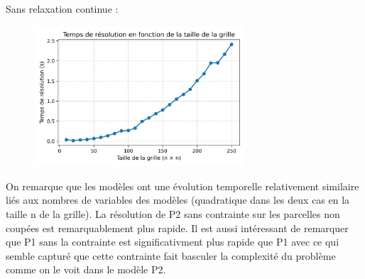\documentclass[a4paper,11pt]{article}
\begin{document}
Sans relaxation continue :
\begin{figure}[H]
  \centering
  \includegraphics[width=0.7\textwidth]{figs/execution_time_P2_binary.png}
\end{figure}

On remarque que les modèles ont une évolution temporelle relativement similaire liés aux nombres de variables des modèles (quadratique dans les deux cas en la taille n de la grille).
La résolution de P2 sans contrainte sur les parcelles non coupées est remarquablement plus rapide. Il est aussi intéressant de remarquer que P1 sans la contrainte est significativment plus rapide que P1 avec ce qui semble capturé que cette contrainte fait basculer la complexité du problème comme on le voit dans le modèle P2.
\end{document}
